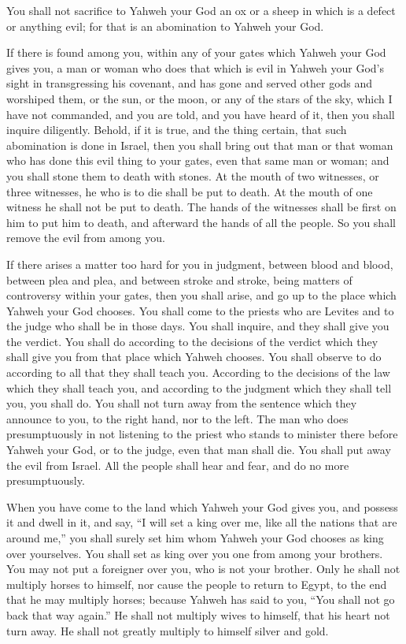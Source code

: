  You shall not sacrifice to Yahweh your God an ox or a
sheep in which is a defect or anything evil; for that is an abomination
to Yahweh your God.

 If there is found among you, within any of your gates
which Yahweh your God gives you, a man or woman who does that which is
evil in Yahweh your God's sight in transgressing his covenant,
 and has gone and served other gods and worshiped them, or
the sun, or the moon, or any of the stars of the sky, which I have not
commanded,  and you are told, and you have heard of it,
then you shall inquire diligently. Behold, if it is true, and the thing
certain, that such abomination is done in Israel,  then
you shall bring out that man or that woman who has done this evil thing
to your gates, even that same man or woman; and you shall stone them to
death with stones.  At the mouth of two witnesses, or
three witnesses, he who is to die shall be put to death. At the mouth of
one witness he shall not be put to death.  The hands of
the witnesses shall be first on him to put him to death, and afterward
the hands of all the people. So you shall remove the evil from among
you.

 If there arises a matter too hard for you in judgment,
between blood and blood, between plea and plea, and between stroke and
stroke, being matters of controversy within your gates, then you shall
arise, and go up to the place which Yahweh your God chooses.
 You shall come to the priests who are Levites and to the
judge who shall be in those days. You shall inquire, and they shall give
you the verdict.  You shall do according to the decisions
of the verdict which they shall give you from that place which Yahweh
chooses. You shall observe to do according to all that they shall teach
you.  According to the decisions of the law which they
shall teach you, and according to the judgment which they shall tell
you, you shall do. You shall not turn away from the sentence which they
announce to you, to the right hand, nor to the left.  The
man who does presumptuously in not listening to the priest who stands to
minister there before Yahweh your God, or to the judge, even that man
shall die. You shall put away the evil from Israel.  All
the people shall hear and fear, and do no more presumptuously.

 When you have come to the land which Yahweh your God
gives you, and possess it and dwell in it, and say, ``I will set a king
over me, like all the nations that are around me,''  you
shall surely set him whom Yahweh your God chooses as king over
yourselves. You shall set as king over you one from among your brothers.
You may not put a foreigner over you, who is not your brother.
 Only he shall not multiply horses to himself, nor cause
the people to return to Egypt, to the end that he may multiply horses;
because Yahweh has said to you, ``You shall not go back that way
again.''  He shall not multiply wives to himself, that
his heart not turn away. He shall not greatly multiply to himself silver
and gold.

